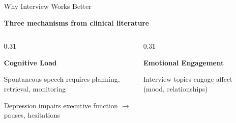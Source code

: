 \documentclass[aspectratio=169,11pt]{beamer}
\begin{document}
\begin{frame}{Why Interview Works Better}
    \begin{center}
        {\large\bfseries\color{uofgblue} Three mechanisms from clinical literature}
    \end{center}
    
    \vspace{0.3cm}
    
    \begin{columns}[T]
        \begin{column}{0.31\textwidth}
            \begin{center}
                {\Large\color{accentblue}\faBrain}
                
                \vspace{0.2cm}
                
                \textbf{Cognitive Load}
            \end{center}
            
            \vspace{0.2cm}
            
            \small
            Spontaneous speech requires planning, retrieval, monitoring
            
            \vspace{0.2cm}
            
            \footnotesize\color{darkgrey}
            Depression impairs executive function $\rightarrow$ pauses, hesitations
        \end{column}
        
        \begin{column}{0.31\textwidth}
            \begin{center}
                {\Large\color{accentblue}\faHeart}
                
                \vspace{0.2cm}
                
                \textbf{Emotional Engagement}
            \end{center}
            
            \vspace{0.2cm}
            
            \small
            Interview topics engage affect (mood, relationships)
            
            \vspace{0.2cm}
            

\end{column}
\end{columns}
\end{frame}
\end{document}
